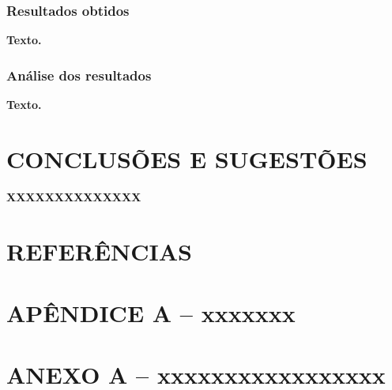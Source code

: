 \documentclass[12pt]{article}
\begin{document}
\subsubsection{Resultados obtidos}
    \begin{justifying}
        \textbf{Texto.}
    \end{justifying}

\subsubsection{Análise dos resultados}
    \begin{justifying}
        \textbf{Texto.}
    \end{justifying}

\newpage

\section{CONCLUSÕES E SUGESTÕES}

    \begin{justifying}
        \textbf{XXXXXXXXXXXXXX}
    \end{justifying}

\nocite{*} %

\newpage

\section{REFERÊNCIAS}



\newpage

\appendix
\section*{APÊNDICE A – xxxxxxx}

\newpage

\section*{ANEXO A – xxxxxxxxxxxxxxxxx}
\end{document}
